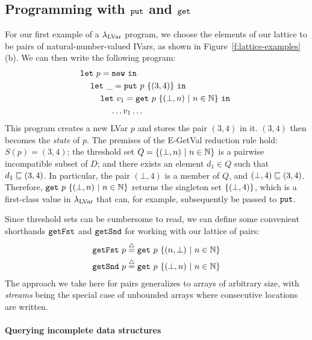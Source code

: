 \subsection{Programming with $\mbox{\texttt{put}}$ and $\mbox{\texttt{get}}$}\label{subsection:lvars-programming-with-put-and-get}

For our first example of a $\lambda_{\textrm{LVar}}$ program, we choose the
elements of our lattice to be pairs of natural-number-valued IVars, as
shown in Figure~\ref{f:lattice-examples}(b).  We can then write the
following program:
\begin{equation}
\begin{split}
& \letexp{p}{\NEW}{ \\
& \letspace \letexp{\_}{\putexp{p}{\stateset{(3,4)}}}{ \\
& \letspace \letspace \letexp{v_1}{\getexp{p}{\stateset{(\bot, n) \setsep n \in \mathbb{N}}}}{ \\
& \letspace \letspace \letspace \dots v_1 \dots}}}
\end{split}
\label{e:getSnd}
\end{equation}
This program creates a new LVar $p$ and stores the pair $(3, 4)$ in
it.  $(3,4)$ then becomes the \emph{state} of $p$.  The premises of
the {\sc E-GetVal} reduction rule hold: $S(p) = (3,4)$; the threshold
set $Q = \lbrace (\bot, n) \ | \  n \in \mathbb{N} \rbrace$ is a pairwise
incompatible subset of $D$; and there exists an element $d_1 \in Q$
such that $d_1 \sqsubseteq (3,4)$.  In particular, the pair $(\bot, 4)$
is a member of $Q$, and $(\bot,4) \sqsubseteq (3,4)$.  Therefore,
$\mbox{\texttt{get}}~p~\lbrace (\bot, n) \ | \  n \in \mathbb{N} \rbrace$ returns
the singleton set $\lbrace (\bot,4) \rbrace$, {which is a first-class value
  in $\lambda_{\textrm{LVar}}$ that can, for example, subsequently be passed to
  $\mbox{\texttt{put}}$.}

Since threshold sets can be cumbersome to read, we can define some
convenient shorthands $\mbox{\texttt{getFst}}$ and $\mbox{\texttt{getSnd}}$ for working with our
lattice of pairs:
\begin{align*}
\mbox{\texttt{getFst}}~p \stackrel{\triangle}{=} \mbox{\texttt{get}}~p~\lbrace (n, \bot) \ | \  n \in
    \mathbb{N} \rbrace \\
\mbox{\texttt{getSnd}}~p \stackrel{\triangle}{=} \mbox{\texttt{get}}~p~\lbrace (\bot, n) \ | \  n \in
    \mathbb{N} \rbrace
\end{align*}
The approach we take here for pairs generalizes to arrays of arbitrary
size, with \emph{streams} being the special case of unbounded arrays
where consecutive locations are written.

\paragraph{Querying incomplete data structures}

